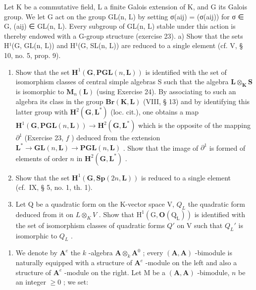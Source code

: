 Let K be a commutative field, L a finite Galois extension of K, and G its Galois group. We let G act on the group GL(n, L) by setting σ(aij) = (σ(aij)) for σ ∈ G, (aij) ∈ GL(n, L). Every subgroup of GL(n, L) stable under this action is thereby endowed with a G-group structure (exercise 23). a) Show that the sets H¹(G, GL(n, L)) and H¹(G, SL(n, L)) are reduced to a single element (cf. V, § 10, no. 5, prop. 9).

\begin{enumerate}
\def\labelenumi{\alph{enumi})}
\setcounter{enumi}{1}
\item
  Show that the set \(\mathbf{H}^{1}(\mathbf{G},\mathbf{PGL}(n,\mathbf{L}))\) is identified with the set of isomorphism classes of central simple algebras S such that the algebra \(\mathbf{L}\otimes_{\mathbf{K}}\mathbf{S}\) is isomorphic to \(\mathbf{M}_{n}(\mathbf{L})\) (using Exercise 24). By associating to such an algebra its class in the group \(\mathbf{Br}(\mathbf{K},\mathbf{L})\) (VIII, § 13) and by identifying this latter group with \(\mathbf{H}^{2}(\mathbf{G},\mathbf{L}^{*})\) (loc. cit.), one obtains a map \(\mathbf{H}^{1}(\mathbf{G},\mathbf{PGL}(n,\mathbf{L}))\to \mathbf{H}^{2}(\mathbf{G},\mathbf{L}^{*})\) which is the opposite of the mapping \(\partial^{1}\) (Exercise 23, \(f\) ) deduced from the extension \(\mathbf{L}^{*}\to \mathbf{GL}(n,\mathbf{L})\to \mathbf{PGL}(n,\mathbf{L})\) . Show that the image of \(\partial^{1}\) is formed of elements of order \(n\) in \(\mathbf{H}^{2}(\mathbf{G},\mathbf{L}^{*})\) .
\item
  Show that the set \(\mathbf{H}^{1}(\mathbf{G},\mathbf{Sp}(2n,\mathbf{L}))\) is reduced to a single element (cf.~IX, § 5, no. 1, th. 1).
\item
  Let Q be a quadratic form on the K-vector space V, \(Q_{L}\) the quadratic form deduced from it on \(L \otimes_{K} V\) . Show that \(\mathrm{H}^{1}(\mathrm{G}, \mathbf{O}(\mathrm{Q}_{\mathrm{L}}))\) is identified with the set of isomorphism classes of quadratic forms \(Q'\) on V such that \(Q_{L}'\) is isomorphic to \(Q_{L}\) .
\end{enumerate}

\begin{enumerate}
\def\labelenumi{\arabic{enumi})}
\setcounter{enumi}{25}
\tightlist
\item
  We denote by \(\mathbf{A}^e\) the \(k\) -algebra \(\mathbf{A} \otimes_k \mathbf{A}^0\) ; every \((\mathbf{A}, \mathbf{A})\) -bimodule is naturally equipped with a structure of \(\mathbf{A}^e\) -module on the left and also a structure of \(\mathbf{A}^e\) -module on the right. Let M be a \((\mathbf{A}, \mathbf{A})\) -bimodule, \(n\) be an integer \(\geqslant 0\) ; we set:
\end{enumerate}

